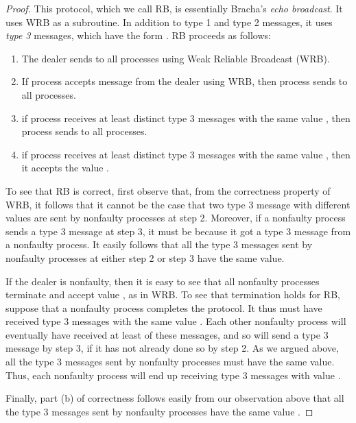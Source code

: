 \documentclass{sig-alternate}
\begin{document}
\begin{proof}
This protocol, which we call RB, is essentially Bracha's \emph{echo
broadcast}.  It uses WRB as a subroutine.  In addition to type 1  and
type 2 messages, it uses \emph{type 3} messages, which have the
form .  RB proceeds as follows:
\begin{enumerate}
\item The dealer sends  to all processes using Weak Reliable
Broadcast (WRB).
\item  If process  accepts  message  from the dealer using WRB,
then process  sends
 to all processes.
\item if process  receives at least  distinct
type 3 messages with the same value ,
then process  sends  to all processes.
\item if process  receives at least   distinct
type 3 messages with the same value , then it accepts the value
.
\end{enumerate}

To see that RB is correct, first observe
that, from the correctness property of WRB, it follows that
it cannot be the case that two type 3 message with different values are
sent by nonfaulty processes at step 2.
Moreover, if a nonfaulty process
sends a type 3 message at step 3, it must be because it got a type 3
message from a nonfaulty process.  It easily follows that all the type 3
messages sent by nonfaulty processes at either step 2 or step 3 have the
same value.


If the dealer is nonfaulty, then it is easy to see that
all nonfaulty processes terminate and accept value , as in WRB.  To
see that
termination holds for RB,
suppose that a nonfaulty process completes the
protocol.
It thus must have received  type 3 messages with the same value
.  Each other nonfaulty process
will eventually have received at least  of these messages,
and so will send a type 3 message by step 3, if it has not already
done so by step 2.  As we argued above, all the type 3 messages sent
by nonfaulty processes must have the same value.  Thus,
each nonfaulty process will end up receiving
 type 3  messages with value .


Finally, part (b) of correctness follows easily from our observation
above that all the type 3 messages sent by nonfaulty processes have the
same value .
\end{proof}
\end{document}
